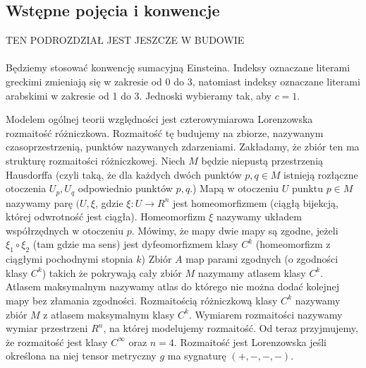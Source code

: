 \subsection{Wstępne pojęcia i konwencje}
TEN PODROZDZIAŁ JEST JESZCZE W BUDOWIE\\
\\

Będziemy stosować konwencję sumacyjną Einsteina. Indeksy 
oznaczane literami greckimi zmieniają się w zakresie od 0 do 3, 
natomiast indeksy oznaczane literami arabskimi 
w zakresie od 1 do 3. Jednoski wybieramy tak, aby $c=1$.

Modelem ogólnej teorii względności jest czterowymiarowa Lorenzowska 
rozmaitość różniczkowa. Rozmaitość tę budujemy na 
zbiorze, nazywanym czasoprzestrzenią, punktów nazywanych zdarzeniami. 
Zakładamy, że zbiór ten ma strukturę rozmaitości różniczkowej.
Niech $M$ będzie niepustą przestrzenią Hausdorffa (czyli taką, że
dla każdych dwóch punktów $p,q\in M$ 
istnieją rozłączne otoczenia $U_p,U_q$ odpowiednio punktów $p,q$.) 
Mapą w otoczeniu $U$ punktu $p\in M$ nazywamy parę $(U,\xi$, gdzie  
$\xi : U \to R^n$ jest homeomorfizmem (ciągłą bijekcją, której 
odwrotność jest ciągła). Homeomorfizm $\xi$ nazywamy układem współrzędnych 
w otoczeniu $p$.
Mówimy, że mapy dwie mapy są zgodne, jeżeli $\xi_1 \circ \xi_2$ (tam 
gdzie ma sens)
jest dyfeomorfizmem klasy $C^k$ (homeomorfizm z 
ciągłymi pochodnymi stopnia $k$)
Zbiór $A$ map parami zgodnych (o zgodności klasy $C^k$) 
takich że pokrywają cały zbiór $M$ nazymamy 
atlasem klasy $C^k$. Atlasem maksymalnym nazywamy atlas do którego
nie można dodać kolejnej mapy bez złamania zgodności.
Rozmaitością różniczkową klasy $C^k$ nazywamy 
zbiór $M$ z atlasem maksymalnym klasy $C^k$.
Wymiarem rozmaitości nazywamy wymiar przestrzeni $R^n$, na której 
modelujemy rozmaitość. Od teraz przyjmujemy, że rozmaitość 
jest klasy $C^\infty$ oraz $n=4$.
Rozmaitość jest Lorenzowska jeśli określona na niej tensor
metryczny $g$ ma sygnaturę $(+,-,-,-)$.


